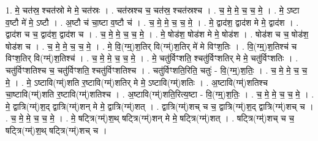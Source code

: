 \documentclass[17pt]{extarticle}
\begin{document}
1. मे॒ चत॑स्र॒ श्चत॑स्रो मे मे॒ चत॑स्रः । . चत॑स्रश्च च॒ चत॑स्र॒ श्चत॑स्रश्च । . च॒ मे॒ मे॒ च॒ च॒ मे॒ । . मे॒ ऽष्टा व॒ष्टौ मे॑ मे॒ ऽष्टौ । . अ॒ष्टौ च॑ चा॒ष्टा व॒ष्टौ च॑ । . च॒ मे॒ मे॒ च॒ च॒ मे॒ । . मे॒ द्वाद॑श॒ द्वाद॑श मे मे॒ द्वाद॑श । . द्वाद॑श च च॒ द्वाद॑श॒ द्वाद॑श च । . च॒ मे॒ मे॒ च॒ च॒ मे॒ । . मे॒ षोड॑श॒ षोड॑श मे मे॒ षोड॑श । . षोड॑श च च॒ षोड॑श॒ षोड॑श च । . च॒ मे॒ मे॒ च॒ च॒ मे॒ । . मे॒ वि॒(ग्म्॒)श॒तिर् वि(ग्म्॑)श॒तिर् मे॑ मे विꣳश॒तिः । . वि॒(ग्म्॒)श॒तिश्च॑ च विꣳश॒तिर् वि(ग्म्॑)श॒तिश्च॑ । . च॒ मे॒ मे॒ च॒ च॒ मे॒ । . मे॒ चतु॑र्विꣳशति॒ श्चतु॑र्विꣳशतिर् मे मे॒ चतु॑र्विꣳशतिः । . चतु॑र्विꣳशतिश्च च॒ चतु॑र्विꣳशति॒ श्चतु॑र्विꣳशतिश्च । . चतु॑र्विꣳशति॒रिति॒ चतुः॑ - वि॒(ग्म्॒)श॒तिः॒ । . च॒ मे॒ मे॒ च॒ च॒ मे॒ । . मे॒ ऽष्टावि(ग्म्॑)शति र॒ष्टावि(ग्म्॑)शतिर् मे मे॒ ऽष्टावि(ग्म्॑)शतिः । . अ॒ष्टावि(ग्म्॑)शतिश्च चा॒ष्टावि(ग्म्॑)शति र॒ष्टावि(ग्म्॑)शतिश्च । . अ॒ष्टावि(ग्म्॑)शति॒रित्य॒ष्टा - वि॒(ग्म्॒)श॒तिः॒ । . च॒ मे॒ मे॒ च॒ च॒ मे॒ । . मे॒ द्वात्रि(ग्म्॑)श॒द् द्वात्रि(ग्म्॑)शन् मे मे॒ द्वात्रि(ग्म्॑)शत् । . द्वात्रि(ग्म्॑)शच् च च॒ द्वात्रि(ग्म्॑)श॒द् द्वात्रि(ग्म्॑)शच् च । . च॒ मे॒ मे॒ च॒ च॒ मे॒ । . मे॒ षट्त्रि(ग्म्॑)श॒थ् षट्त्रि(ग्म्॑)शन् मे मे॒ षट्त्रि(ग्म्॑)शत् । . षट्त्रि(ग्म्॑)शच् च च॒ षट्त्रि(ग्म्॑)श॒थ् षट्त्रि(ग्म्॑)शच् च । \newline
\end{document}
